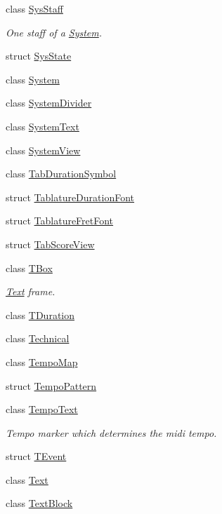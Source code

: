 \begin{DoxyCompactItemize}
class \hyperlink{class_ms_1_1_sys_staff}{Sys\+Staff}
\begin{DoxyCompactList}\small\item\em One staff of a \hyperlink{class_ms_1_1_system}{System}. \end{DoxyCompactList}\item 
struct \hyperlink{struct_ms_1_1_sys_state}{Sys\+State}
\item 
class \hyperlink{class_ms_1_1_system}{System}
\item 
class \hyperlink{class_ms_1_1_system_divider}{System\+Divider}
\item 
class \hyperlink{class_ms_1_1_system_text}{System\+Text}
\item 
class \hyperlink{class_ms_1_1_system_view}{System\+View}
\item 
class \hyperlink{class_ms_1_1_tab_duration_symbol}{Tab\+Duration\+Symbol}
\item 
struct \hyperlink{struct_ms_1_1_tablature_duration_font}{Tablature\+Duration\+Font}
\item 
struct \hyperlink{struct_ms_1_1_tablature_fret_font}{Tablature\+Fret\+Font}
\item 
struct \hyperlink{struct_ms_1_1_tab_score_view}{Tab\+Score\+View}
\item 
class \hyperlink{class_ms_1_1_t_box}{T\+Box}
\begin{DoxyCompactList}\small\item\em \hyperlink{class_ms_1_1_text}{Text} frame. \end{DoxyCompactList}\item 
class \hyperlink{class_ms_1_1_t_duration}{T\+Duration}
\item 
class \hyperlink{class_ms_1_1_technical}{Technical}
\item 
class \hyperlink{class_ms_1_1_tempo_map}{Tempo\+Map}
\item 
struct \hyperlink{struct_ms_1_1_tempo_pattern}{Tempo\+Pattern}
\item 
class \hyperlink{class_ms_1_1_tempo_text}{Tempo\+Text}
\begin{DoxyCompactList}\small\item\em Tempo marker which determines the midi tempo. \end{DoxyCompactList}\item 
struct \hyperlink{struct_ms_1_1_t_event}{T\+Event}
\item 
class \hyperlink{class_ms_1_1_text}{Text}
\item 
class \hyperlink{class_ms_1_1_text_block}{Text\+Block}

\end{DoxyCompactItemize}
